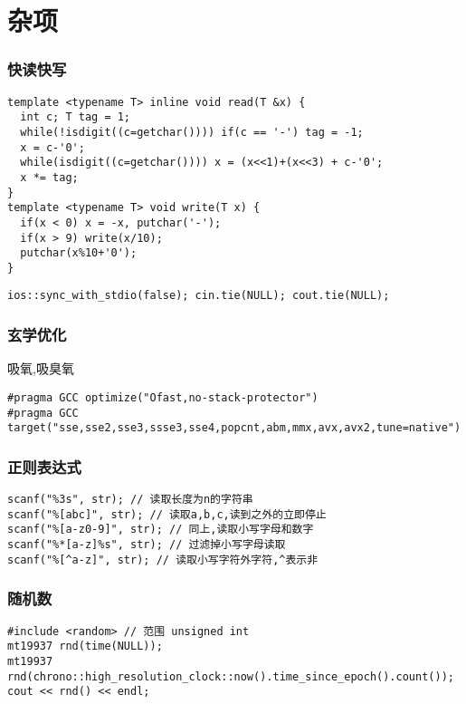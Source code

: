 \documentclass[12pt]{article}
\begin{document}
     
\tableofcontents
\newpage

\part{杂项}
\section{快读快写}
{\setmainfont{Consolas}
\begin{lstlisting}
template <typename T> inline void read(T &x) {
  int c; T tag = 1;
  while(!isdigit((c=getchar()))) if(c == '-') tag = -1;
  x = c-'0';
  while(isdigit((c=getchar()))) x = (x<<1)+(x<<3) + c-'0';
  x *= tag;
}
template <typename T> void write(T x) {
  if(x < 0) x = -x, putchar('-');
  if(x > 9) write(x/10);
  putchar(x%10+'0');
}
\end{lstlisting}
{\setmainfont{Consolas}
\begin{lstlisting}
ios::sync_with_stdio(false); cin.tie(NULL); cout.tie(NULL);
\end{lstlisting}


\section{玄学优化}

吸氧,吸臭氧
{\setmainfont{Consolas}
\begin{lstlisting}
#pragma GCC optimize("Ofast,no-stack-protector")
#pragma GCC target("sse,sse2,sse3,ssse3,sse4,popcnt,abm,mmx,avx,avx2,tune=native")
\end{lstlisting}

\section{正则表达式}
{\setmainfont{Consolas}
\begin{lstlisting}
scanf("%3s", str); // 读取长度为n的字符串
scanf("%[abc]", str); // 读取a,b,c,读到之外的立即停止
scanf("%[a-z0-9]", str); // 同上,读取小写字母和数字
scanf("%*[a-z]%s", str); // 过滤掉小写字母读取
scanf("%[^a-z]", str); // 读取小写字符外字符,^表示非 
\end{lstlisting}
\section{随机数}
{\setmainfont{Consolas}
\begin{lstlisting}
#include <random> // 范围 unsigned int
mt19937 rnd(time(NULL));
mt19937 rnd(chrono::high_resolution_clock::now().time_since_epoch().count());
cout << rnd() << endl;


\end{lstlisting}}}}}}
\end{document}
